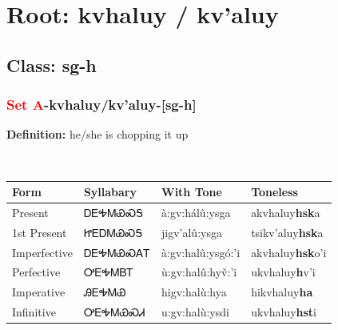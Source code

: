 \needspace{4in}
\section*{Root: kvhaluy / kv'aluy}
\nopagebreak
{}
\needspace{3in}
\subsection*{Class: sg-h}
\nopagebreak
\needspace{2in}
\subsubsection*{\textcolor{Red}{Set A}{-}\textbf{kvhaluy/kv'aluy}{-}[sg-h]}
\nopagebreak
\textbf{Definition: } he/she is chopping it up
\\[0.5em]
\begin{tabularx}{\textwidth}{l X X X}%
\toprule%
\textbf{Form}&\textbf{Syllabary}&\textbf{With Tone}&\textbf{Toneless}\\%
\midrule%
Present&ᎠᎬᎭᎷᏯᏍᎦ&à:gv:hálû:ysga&akvhaluy\textbf{hsk}a\\%
1st Present&ᏥᎬᎠᎷᏯᏍᎦ&jigv’alû:ysga&tsikv'aluy\textbf{hsk}a\\%
Imperfective&ᎠᎬᎭᎷᏯᏍᎪᎢ&à:gv:halû:ysgó:’i&akvhaluy\textbf{hsk}o'i\\%
Perfective&ᎤᎬᎭᎷᏴᎢ&ù:gv:halû:hyv̌:’i&ukvhaluy\textbf{h}v'i\\%
Imperative&ᎯᎬᎭᎷᏯ&higv:halù:hya&hikvhaluy\textbf{ha}\\%
Infinitive&ᎤᎬᎭᎷᏯᏍᏗ&u:gv:halù:ysdi&ukvhaluy\textbf{hst}i\\%
\bottomrule%
\end{tabularx}
\\[1em]